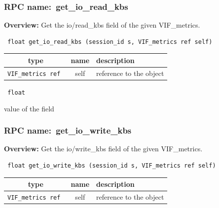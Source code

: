 \subsubsection{RPC name:~get\_io\_read\_kbs}

{\bf Overview:} 
Get the io/read\_kbs field of the given VIF\_metrics.

\begin{verbatim} float get_io_read_kbs (session_id s, VIF_metrics ref self)\end{verbatim}



 
\vspace{0.3cm}
\begin{tabular}{|c|c|p{7cm}|}
 \hline
{\bf type} & {\bf name} & {\bf description} \\ \hline
{\tt VIF\_metrics ref } & self & reference to the object \\ \hline 

\end{tabular}

\vspace{0.3cm}

{\tt 
float
}


value of the field
\vspace{0.3cm}
\vspace{0.3cm}
\vspace{0.3cm}
\subsubsection{RPC name:~get\_io\_write\_kbs}

{\bf Overview:} 
Get the io/write\_kbs field of the given VIF\_metrics.

\begin{verbatim} float get_io_write_kbs (session_id s, VIF_metrics ref self)\end{verbatim}



 
\vspace{0.3cm}
\begin{tabular}{|c|c|p{7cm}|}
 \hline
{\bf type} & {\bf name} & {\bf description} \\ \hline
{\tt VIF\_metrics ref } & self & reference to the object \\ \hline 

\end{tabular}


